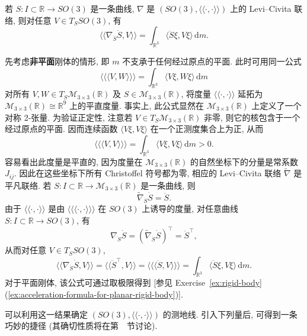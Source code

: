 \begin{RiemannProposition}\label{prop:covariant-acceleration-of-rigid-body}
若 $S:I\subset\mathbb{R}\to SO(3)$ 是一条曲线, $\nabla$ 是 $(SO(3),\langle\!\langle\cdot,\cdot\rangle\!\rangle)$ 上的 Levi–Civita 联络, 则对任意 $V\in T_SSO(3)$, 有
\[
  \langle\!\langle\nabla_{\dot S}\dot S,V\rangle\!\rangle
  =\int_{\mathbb{R}^3}\langle\ddot S\xi,V\xi\rangle\,\mathrm{d}m.
\]
\end{RiemannProposition}

\begin{RiemannProof}
先考虑\textbf{非平面}刚体的情形, 即 $m$ 不支承于任何经过原点的平面. 此时可用同一公式
\[
  \langle\!\langle\!\langle V,W\rangle\!\rangle\!\rangle
  =\int_{\mathbb{R}^3}\langle V\xi,W\xi\rangle\,\mathrm{d}m
\]
对所有 $V,W\in T_S\mathcal{M}_{3\times3}(\mathbb{R})$ 及 $S\in\mathcal{M}_{3\times3}(\mathbb{R})$, 将度量 $\langle\!\langle\cdot,\cdot\rangle\!\rangle$ 延拓为 $\mathcal{M}_{3\times3}(\mathbb{R})\cong\mathbb{R}^9$ 上的平直度量. 事实上, 此公式显然在 $\mathcal{M}_{3\times3}(\mathbb{R})$ 上定义了一个对称 2-张量. 为验证正定性, 注意若 $V\in T_S\mathcal{M}_{3\times3}(\mathbb{R})$ 非零, 则它的核包含于一个经过原点的平面. 因而连续函数 $\langle V\xi,V\xi\rangle$ 在一个正测度集合上为正, 从而
\[
  \langle\!\langle\!\langle V,V\rangle\!\rangle\!\rangle
    =\int_{\mathbb{R}^3}\langle V\xi,V\xi\rangle\,\mathrm{d}m>0.
\]
容易看出此度量是平直的, 因为度量在 $\mathcal{M}_{3\times3}(\mathbb{R})$ 的自然坐标下的分量是常系数 $J_{ij}$. 因此在这些坐标下所有 Christoffel 符号都为零, 相应的 Levi–Civita 联络 $\widetilde\nabla$ 是平凡联络. 若 $S:I\subset\mathbb{R}\to\mathcal{M}_{3\times3}(\mathbb{R})$ 是一条曲线, 则
\[
  \widetilde\nabla_{\dot S}\dot S=\ddot S.
\]
由于 $\langle\!\langle\cdot,\cdot\rangle\!\rangle$ 是由 $\langle\!\langle\!\langle\cdot,\cdot\rangle\!\rangle\!\rangle$ 在 $SO(3)$ 上诱导的度量, 对任意曲线 $S:I\subset\mathbb{R}\to SO(3)$, 有
\[
  \nabla_{\dot S}\dot S=(\widetilde\nabla_{\dot S}\dot S)^\top=\ddot S^\top,
\]
从而对任意 $V\in T_SSO(3)$,
\[
  \langle\!\langle\nabla_{\dot S}\dot S,V\rangle\!\rangle
    =\langle\!\langle\ddot S^\top,V\rangle\!\rangle
    =\langle\!\langle\!\langle\ddot S,V\rangle\!\rangle\!\rangle
    =\int_{\mathbb{R}^3}\langle\ddot S\xi,V\xi\rangle\,\mathrm{d}m.
\]
对于平面刚体, 该公式可通过取极限得到 [参见 Exercise~\ref{ex:rigid-body}(\ref{ex:acceleration-formula-for-planar-rigid-body})].
\end{RiemannProof}

可以利用这一结果确定 $(SO(3),\langle\!\langle\cdot,\cdot\rangle\!\rangle)$ 的测地线. 引入下列量后, 可得到一条巧妙的捷径 (其确切性质将在第~~节讨论).

